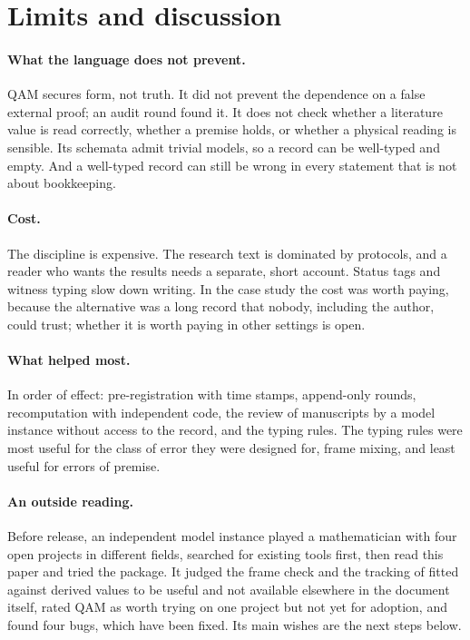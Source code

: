 \section{Limits and discussion}\label{sec:limits}

\paragraph{What the language does not prevent.}  QAM secures form, not truth.  It did not prevent the dependence on a false external proof; an
audit round found it.  It does not check whether a literature value is read correctly, whether a premise holds, or whether a physical reading is
sensible.  Its schemata admit trivial models, so a record can be well-typed and empty.  And a well-typed record can still be wrong in every
statement that is not about bookkeeping.

\paragraph{Cost.}  The discipline is expensive.  The research text is dominated by protocols, and a reader who wants the results needs a separate,
short account.  Status tags and witness typing slow down writing.  In the case study the cost was worth paying, because the alternative was a long
record that nobody, including the author, could trust; whether it is worth paying in other settings is open.

\paragraph{What helped most.}  In order of effect: pre-registration with time stamps, append-only rounds, recomputation with independent code,
the review of manuscripts by a model instance without access to the record, and the typing rules.  The typing rules were most useful for the class
of error they were designed for, frame mixing, and least useful for errors of premise.

\paragraph{An outside reading.}  Before release, an independent model instance played a mathematician with four open projects in
different fields, searched for existing tools first, then read this paper and tried the package.  It judged the frame check and the
tracking of fitted against derived values to be useful and not available elsewhere in the document itself, rated QAM as worth trying on
one project but not yet for adoption, and found four bugs, which have been fixed.  Its main wishes are the next steps below.


